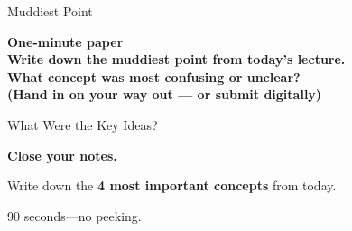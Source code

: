 \documentclass[aspectratio=169, 12pt]{beamer}
\begin{document}
\begin{frame}{Muddiest Point}

\centering
\Large\bfseries One-minute paper\\[0.5cm]
\normalsize Write down the \textbf{muddiest point} from today's lecture.\\[0.2cm]
{\small What concept was most confusing or unclear?}\\[0.5cm]
{\footnotesize\textcolor{midgray}{(Hand in on your way out --- or submit digitally)}}
\end{frame}

\begin{frame}{What Were the Key Ideas?}

\centering
\vspace{1.5cm}
{\Large\bfseries Close your notes.}

\vspace{0.8cm}
{\large Write down the \textbf{4 most important concepts} from today.}

\vspace{0.8cm}
{\normalsize\textcolor{midgray}{90 seconds---no peeking.}}

\end{frame}
\end{document}
